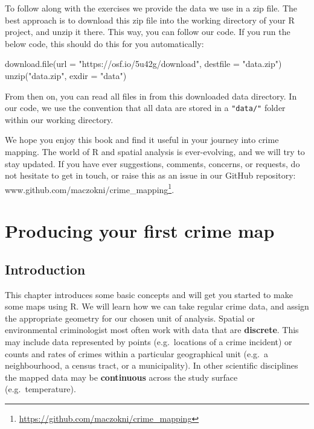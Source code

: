 \documentclass[
]{book}
\makeatletter
\newenvironment{Shaded}{\begin{snugshade}}{\end{snugshade}}
\newcommand{\AttributeTok}[1]{\textcolor[rgb]{0.61,0.61,0.61}{#1}}
\newcommand{\FunctionTok}[1]{\textcolor[rgb]{0,0,0}{#1}}
\newcommand{\NormalTok}[1]{#1}
\newcommand{\StringTok}[1]{\textcolor[rgb]{0.5,0.5,0.5}{#1}}
\renewcommand{\href}[2]{#2\footnote{\url{#1}}}
\newenvironment{kframe}{%
\medskip{}
\setlength{\fboxsep}{.8em}
 \def\at@end@of@kframe{}%
 \ifinner\ifhmode%
  \def\at@end@of@kframe{\end{minipage}}%
  \begin{minipage}{\columnwidth}%
 \fi\fi%
 \def\FrameCommand##1{\hskip\@totalleftmargin \hskip-\fboxsep
 \colorbox{shadecolor}{##1}\hskip-\fboxsep
     \hskip-\linewidth \hskip-\@totalleftmargin \hskip\columnwidth}%
 \MakeFramed {\advance\hsize-\width
   \@totalleftmargin\z@ \linewidth\hsize
   \@setminipage}}%
 {\par\unskip\endMakeFramed%
 \at@end@of@kframe}
\renewenvironment{Shaded}{\begin{kframe}}{\end{kframe}}
\makeatother
\begin{document}
To follow along with the exercises we provide the data we use in a zip file. The best approach is to download this zip file into the working directory of your R project, and unzip it there. This way, you can follow our code. If you run the below code, this should do this for you automatically:

\begin{Shaded}
\begin{Highlighting}[]
\FunctionTok{download.file}\NormalTok{(}\AttributeTok{url =} \StringTok{"https://osf.io/5u42g/download"}\NormalTok{, }
              \AttributeTok{destfile =} \StringTok{"data.zip"}\NormalTok{)}
\FunctionTok{unzip}\NormalTok{(}\StringTok{"data.zip"}\NormalTok{, }\AttributeTok{exdir =} \StringTok{"data"}\NormalTok{)}
\end{Highlighting}
\end{Shaded}

From then on, you can read all files in from this downloaded data directory. In our code, we use the convention that all data are stored in a \texttt{"data/"} folder within our working directory.

We hope you enjoy this book and find it useful in your journey into crime mapping. The world of R and spatial analysis is ever-evolving, and we will try to stay updated. If you have ever suggestions, comments, concerns, or requests, do not hesitate to get in touch, or raise this as an issue in our GitHub repository: \href{https://github.com/maczokni/crime_mapping}{www.github.com/maczokni/crime\_mapping}.

\hypertarget{producing-your-first-crime-map}{%
\chapter{Producing your first crime map}\label{producing-your-first-crime-map}}

\hypertarget{introduction}{%
\section{Introduction}\label{introduction}}

This chapter introduces some basic concepts and will get you started to make some maps using R. We will learn how we can take regular crime data, and assign the appropriate geometry for our chosen unit of analysis. Spatial or environmental criminologist most often work with data that are \textbf{discrete}. This may include data represented by points (e.g.~locations of a crime incident) or counts and rates of crimes within a particular geographical unit (e.g.~a neighbourhood, a census tract, or a municipality). In other scientific disciplines the mapped data may be \textbf{continuous} across the study surface (e.g.~temperature).
\end{document}
